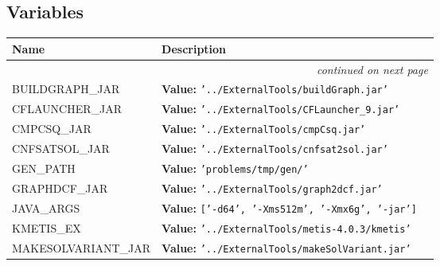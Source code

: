   \subsection{Variables}

    \vspace{-1cm}
\hspace{\varindent}\begin{longtable}{|p{\varnamewidth}|p{\vardescrwidth}|l}
\cline{1-2}
\cline{1-2} \centering \textbf{Name} & \centering \textbf{Description}& \\
\cline{1-2}
\endhead\cline{1-2}\multicolumn{3}{r}{\small\textit{continued on next page}}\\\endfoot\cline{1-2}
\endlastfoot\raggedright B\-U\-I\-L\-D\-G\-R\-A\-P\-H\-\_\-J\-A\-R\- & \raggedright \textbf{Value:} 
{\tt \texttt{'}\texttt{../ExternalTools/buildGraph.jar}\texttt{'}}&\\
\cline{1-2}
\raggedright C\-F\-L\-A\-U\-N\-C\-H\-E\-R\-\_\-J\-A\-R\- & \raggedright \textbf{Value:} 
{\tt \texttt{'}\texttt{../ExternalTools/CFLauncher\_9.jar}\texttt{'}}&\\
\cline{1-2}
\raggedright C\-M\-P\-C\-S\-Q\-\_\-J\-A\-R\- & \raggedright \textbf{Value:} 
{\tt \texttt{'}\texttt{../ExternalTools/cmpCsq.jar}\texttt{'}}&\\
\cline{1-2}
\raggedright C\-N\-F\-S\-A\-T\-2\-S\-O\-L\-\_\-J\-A\-R\- & \raggedright \textbf{Value:} 
{\tt \texttt{'}\texttt{../ExternalTools/cnfsat2sol.jar}\texttt{'}}&\\
\cline{1-2}
\raggedright G\-E\-N\-\_\-P\-A\-T\-H\- & \raggedright \textbf{Value:} 
{\tt \texttt{'}\texttt{problems/tmp/gen/}\texttt{'}}&\\
\cline{1-2}
\raggedright G\-R\-A\-P\-H\-2\-D\-C\-F\-\_\-J\-A\-R\- & \raggedright \textbf{Value:} 
{\tt \texttt{'}\texttt{../ExternalTools/graph2dcf.jar}\texttt{'}}&\\
\cline{1-2}
\raggedright J\-A\-V\-A\-\_\-A\-R\-G\-S\- & \raggedright \textbf{Value:} 
{\tt \texttt{[}\texttt{'}\texttt{-d64}\texttt{'}\texttt{, }\texttt{'}\texttt{-Xms512m}\texttt{'}\texttt{, }\texttt{'}\texttt{-Xmx6g}\texttt{'}\texttt{, }\texttt{'}\texttt{-jar}\texttt{'}\texttt{]}}&\\
\cline{1-2}
\raggedright K\-M\-E\-T\-I\-S\-\_\-E\-X\- & \raggedright \textbf{Value:} 
{\tt \texttt{'}\texttt{../ExternalTools/metis-4.0.3/kmetis}\texttt{'}}&\\
\cline{1-2}
\raggedright M\-A\-K\-E\-S\-O\-L\-V\-A\-R\-I\-A\-N\-T\-\_\-J\-A\-R\- & \raggedright \textbf{Value:} 
{\tt \texttt{'}\texttt{../ExternalTools/makeSolVariant.jar}\texttt{'}}&\\

\end{longtable}
